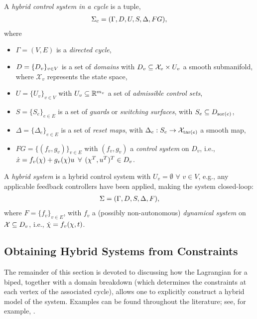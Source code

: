 \begin{definition} A {\em hybrid control system in a cycle} is a tuple,
  \begin{align}
    \Sigma_{c} = (\Gamma, D, U, S, \Delta, FG),
  \end{align}
  where
  \begin{itemize}
  \item $\Gamma = (V,E)$ is a {\em directed cycle},
  \item $D = \{D_{v}\}_{v \in V}$ is a set of {\em domains} with $D_{v} \subseteq \mathcal{X}_{v} \times U_v$ a smooth submanifold, where $\mathcal{X}_{v}$ represents the state space,
  \item $U = \{U_{v}\}_{v \in V}$ with $U_{v} \subseteq \mathbb{R}^{m_{v}}$ a set of {\em admissible control sets},
  \item $S = \{S_{e}\}_{e \in E}$ is a set of {\em guards} or {\em switching surfaces}, with $S_{e} \subseteq D_{\mathrm{sor}(e)}$,
  \item $\Delta = \{\Delta_{e}\}_{e \in E}$ is a set of {\em reset maps}, with $\Delta_{e} : S_{e} \to \mathcal{X}_{\mathrm{tar}(e)}$ a smooth map,
  \item $FG = \{(f_{v}, g_{v})\}_{v \in E}$ with $(f_v,g_v)$ a {\em control system} on $D_{v}$, i.e., $\dot{x} = f_{v}(\chi) + g_{v}(\chi) u$ $\forall$ $(\chi^{T}, u^{T})^{T} \in D_{v}$.
  \end{itemize}
\end{definition}

\begin{definition}
  A {\em hybrid system} is a hybrid control system with $U_v = \emptyset$ $\forall$ $v \in V$, e.g., any applicable feedback controllers have been applied, making the system closed-loop:
  \begin{align}
    \Sigma = (\Gamma, D, S, \Delta, F),
  \end{align}
  where $F = \{f_{v}\}_{v \in E}$, with $f_{v}$ a (possibly non-autonomous) {\em dynamical system} on $\mathcal{X} \subseteq D_{v}$, i.e., ${\dot {\chi}} = f_{v}(\chi,t)$.
\end{definition}

\subsection{Obtaining Hybrid Systems from Constraints}
The remainder of this section is devoted to discussing how the Lagrangian for a biped, together with a domain breakdown (which determines the constraints at each vertex of the associated cycle), allows one to explicitly construct a hybrid model of the system.
%
Examples can be found throughout the literature; see, for example, \cite{Grizzle2010,Grizzle2014,Sinnet2009}.


